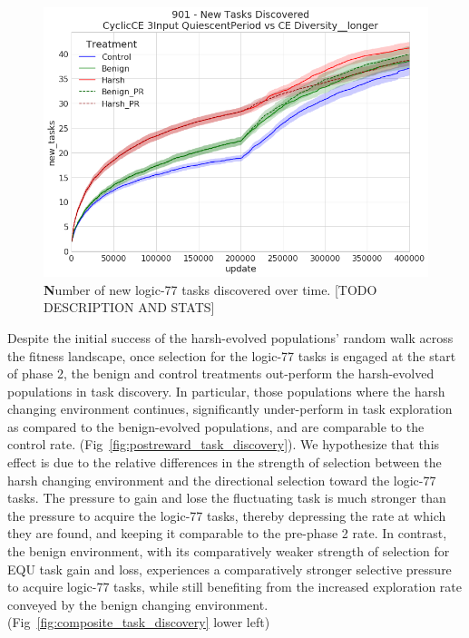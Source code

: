 \documentclass[PhD]{msu-thesis}
\begin{document}
\begin{figure}[!h]
\includegraphics[trim={0 0 0 0}, clip, width=0.75\columnwidth]{figures/CE/901_overall_task_discovery.png}
\caption{{\textbf Number of new logic-77 tasks discovered over time}. [TODO DESCRIPTION AND STATS]%
}
\label{fig:overall_task_discovery}
\end{figure}

Despite the initial success of the harsh-evolved populations' random walk across the fitness landscape, once selection for the logic-77 tasks is engaged at the start of phase 2, the benign and control treatments out-perform the harsh-evolved populations in task discovery. In particular, those populations where the harsh changing environment continues, significantly under-perform in task exploration as compared to the benign-evolved populations, and are comparable to the control rate. (Fig~\ref{fig:postreward_task_discovery}). We hypothesize that this effect is due to the relative differences in the strength of selection between the harsh changing environment and the directional selection toward the logic-77 tasks. The pressure to gain and lose the fluctuating task is much stronger than the pressure to acquire the logic-77 tasks, thereby depressing the rate at which they are found, and keeping it comparable to the pre-phase 2 rate. In contrast, the benign environment, with its comparatively weaker strength of selection for EQU task gain and loss, experiences a comparatively stronger selective pressure to acquire logic-77 tasks, while still benefiting from the increased exploration rate conveyed by the benign changing environment. (Fig~\ref{fig:composite_task_discovery} lower left)
\end{document}
